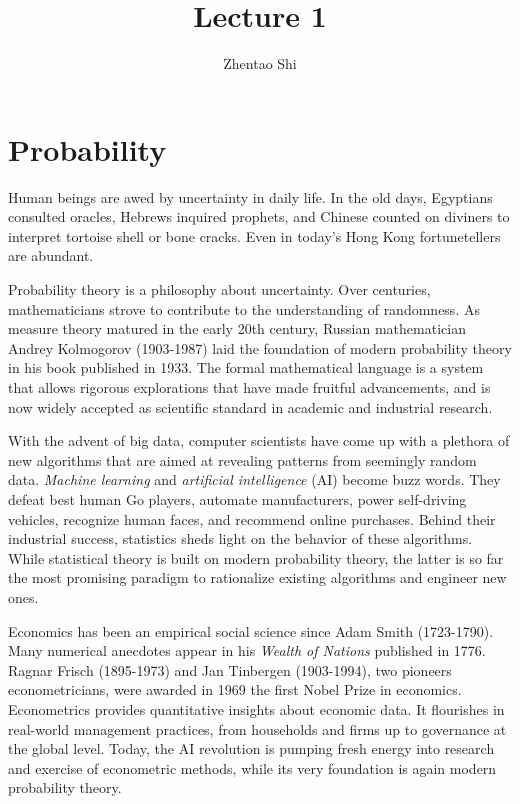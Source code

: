 \documentclass[11pt]{article}
\title{Lecture 1}
\author{Zhentao Shi}
\begin{document}
    
    
    \maketitle
    
    

    
    \section{Probability}\label{probability}

Human beings are awed by uncertainty in daily life. In the old days,
Egyptians consulted oracles, Hebrews inquired prophets, and Chinese
counted on diviners to interpret tortoise shell or bone cracks. Even in
today's Hong Kong fortunetellers are abundant.

Probability theory is a philosophy about uncertainty. Over centuries,
mathematicians strove to contribute to the understanding of randomness.
As measure theory matured in the early 20th century, Russian
mathematician Andrey Kolmogorov (1903-1987) laid the foundation of
modern probability theory in his book published in 1933. The formal
mathematical language is a system that allows rigorous explorations that
have made fruitful advancements, and is now widely accepted as
scientific standard in academic and industrial research.

With the advent of big data, computer scientists have come up with a
plethora of new algorithms that are aimed at revealing patterns from
seemingly random data. \emph{Machine learning} and \emph{artificial
intelligence} (AI) become buzz words. They defeat best human Go players,
automate manufacturers, power self-driving vehicles, recognize human
faces, and recommend online purchases. Behind their industrial success,
statistics sheds light on the behavior of these algorithms. While
statistical theory is built on modern probability theory, the latter is
so far the most promising paradigm to rationalize existing algorithms
and engineer new ones.

Economics has been an empirical social science since Adam Smith
(1723-1790). Many numerical anecdotes appear in his \emph{Wealth of
Nations} published in 1776. Ragnar Frisch (1895-1973) and Jan Tinbergen
(1903-1994), two pioneers econometricians, were awarded in 1969 the
first Nobel Prize in economics. Econometrics provides quantitative
insights about economic data. It flourishes in real-world management
practices, from households and firms up to governance at the global
level. Today, the AI revolution is pumping fresh energy into research
and exercise of econometric methods, while its very foundation is again
modern probability theory.
\end{document}
